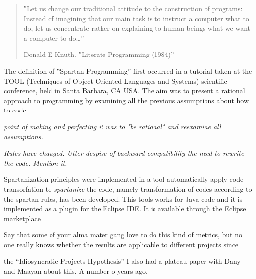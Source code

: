 \begin{quote}
  ‟Let us change our traditional attitude to the construction of programs:
  Instead of imagining that our main task is to instruct a computer what to do,
  let us concentrate rather on explaining to human beings what we want a computer
  to do…”
  \begin{flushright}
   \upshape Donald E Knuth. ‟Literate Programming (1984)”
  \end{flushright}
\end{quote}


The definition of ‟Spartan Programming” first occurred in a tutorial taken at
the TOOL (Techniques of Object Oriented Languages and Systems) scientific conference,
held in Santa Barbara, CA USA. %
The aim was to present a rational approach to programming by examining all the previous
assumptions about how to code.

\emph{point of making and perfecting it was to "be rational" and
reexamine all assumptions.}

\emph{Rules have changed.
Utter despise of backward compatibility the need to rewrite the code.
Mention it.}


Spartanization principles were implemented in a tool automatically apply code transorfation
to \emph{spartanize} the code, namely transformation of codes according to the spartan rules, has been developed.
This tools works for Java code and it is implemented as a plugin for the Eclipse
IDE\@. It is available through the Eclipse marketplace

Say that some of your alma mater gang love to do this kind of metrics, but
no one really knows whether the results are applicable to different projects
since~\cite{Turnu:Concas:Marchesi:Tonelli:11}

the ``Idiosyncratic Projects Hypothesis'' I also had a plateau paper with
Dany and Maayan about this. A number o years ago.\cite{Gil:2011:Goldstein:Moshkovich:2011}

